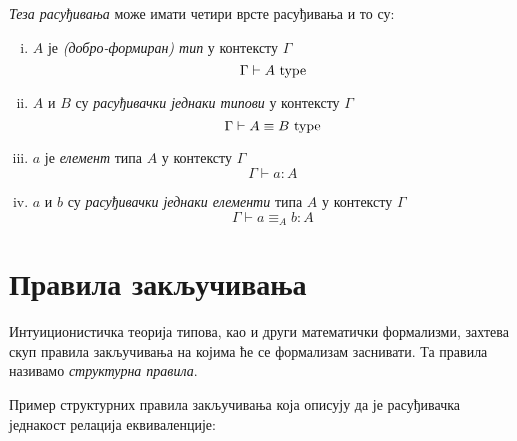 \documentclass[12pt,oneside]{memoir}
\begin{document}
\begin{definition}
    \emph{Теза расуђивања} може имати четири врсте расуђивања и то су:
    \begin{enumerate}[(i)]
        \item{$A$ је \emph{(добро-формиран) тип} у контексту $\Gamma$ \[\Gamma\vdash A~{\mathrm{type}}\]}
        \item{$A$ и $B$ су \emph{расуђивачки једнаки типови} у контексту $\Gamma$ \[\Gamma\vdash A \equiv B~{\mathrm{type}}\]}
        \item{$a$ је \emph{елемент} типа $A$ у контексту $\Gamma$ \[\Gamma\vdash a : A\]}
        \item{$a$ и $b$ су \emph{расуђивачки једнаки елементи} типа $A$ у контексту $\Gamma$ \[\Gamma\vdash a \equiv_A b : A\]}
    \end{enumerate}
\end{definition}

\section{Правила закључивања}

Интуиционистичка теорија типова, као и други математички формализми, захтева скуп правила закључивања на којима ће се формализам заснивати. Та правила називамо \emph{структурна правила}.

Пример структурних правила закључивања која описују да је расуђивачка једнакост релација еквиваленције:
\end{document}

